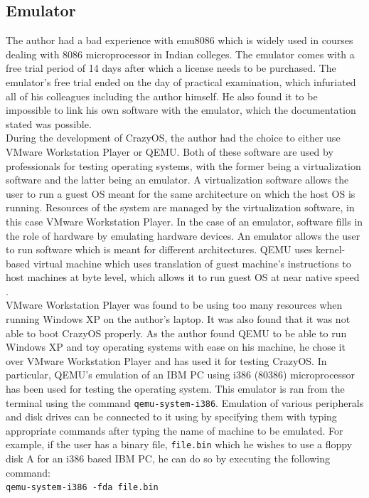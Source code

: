\subsection{Emulator}
The author had a bad experience with emu8086 which is widely used in courses dealing with 8086 microprocessor in Indian colleges. The emulator comes with a free trial period of 14 days after which a license needs to be purchased. The emulator's free trial ended on the day of practical examination, which infuriated all of his colleagues including the author himself. He also found it to be impossible to link his own software with the emulator, which the documentation stated was possible.\\
During the development of CrazyOS, the author had the choice to either use VMware Workstation Player or QEMU. Both of these software are used by professionals for testing operating systems, with the former being a virtualization software and the latter being an emulator. A virtualization software allows the user to run a guest OS meant for the same architecture on which the host OS is running. Resources of the system are managed by the virtualization software, in this case VMware Workstation Player. In the case of an emulator, software fills in the role of hardware by emulating hardware devices. An emulator allows the user to run software which is meant for different architectures. QEMU uses kernel-based virtual machine which uses translation of guest machine's instructions to host machines at byte level, which allows it to run guest OS at near native speed \cite{bellard2005qemu}.\\
VMware Workstation Player was found to be using too many resources when running Windows XP on the author's laptop. It was also found that it was not able to boot CrazyOS properly. As the author found QEMU to be able to run Windows XP and toy operating systems with ease on his machine, he chose it over VMware Workstation Player and has used it for testing CrazyOS. In particular, QEMU's emulation of an IBM PC using i386 (80386) microprocessor has been used for testing the operating system. This emulator is ran from the terminal using the command \verb|qemu-system-i386|. Emulation of various peripherals and disk drives can be connected to it using by specifying them with typing appropriate commands after typing the name of machine to be emulated. For example, if the user has a binary file, \verb|file.bin| which he wishes to use a floppy disk A for an i386 based IBM PC, he can do so by executing the following command:\\
\texttt{qemu-system-i386 -fda file.bin}

